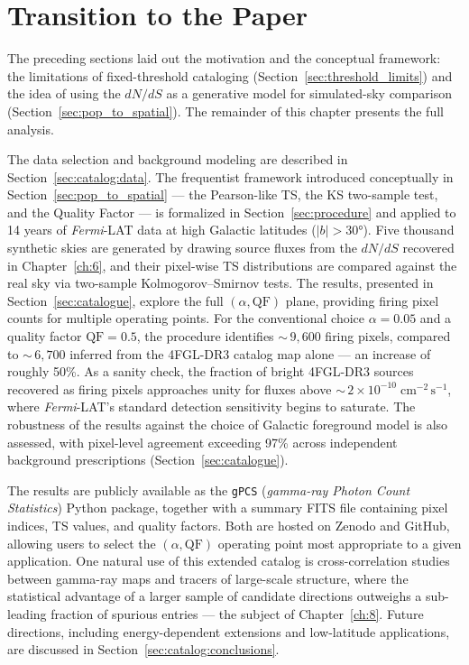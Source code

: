 
\section{Transition to the Paper}
\label{sec:transition_catalog}

The preceding sections laid out the motivation and the conceptual framework: the limitations of fixed-threshold cataloging (Section~\ref{sec:threshold_limits}) and the idea of using the $dN/dS$ as a generative model for simulated-sky comparison (Section~\ref{sec:pop_to_spatial}).
The remainder of this chapter presents the full analysis.

The data selection and background modeling are described in Section~\ref{sec:catalog:data}. The frequentist framework introduced conceptually in Section~\ref{sec:pop_to_spatial} --- the Pearson-like TS, the KS two-sample test, and the Quality Factor --- is formalized in Section~\ref{sec:procedure} and applied to 14 years of \textit{Fermi}-LAT data at high Galactic latitudes ($|b| > 30°$). Five thousand synthetic skies are generated by drawing source fluxes from the $dN/dS$ recovered in Chapter~\ref{ch:6}, and their pixel-wise TS distributions are compared against the real sky via two-sample Kolmogorov--Smirnov tests. The results, presented in Section~\ref{sec:catalogue}, explore the full $(\alpha, \mathrm{QF})$ plane, providing firing pixel counts for multiple operating points.
For the conventional choice $\alpha = 0.05$ and a quality factor $\mathrm{QF} = 0.5$, the procedure identifies ${\sim}\,9{,}600$ firing pixels, compared to ${\sim}\,6{,}700$ inferred from the 4FGL-DR3 catalog map alone --- an increase of roughly 50\%.
As a sanity check, the fraction of bright 4FGL-DR3 sources recovered as firing pixels approaches unity for fluxes above ${\sim}\,2 \times 10^{-10}\;\mathrm{cm^{-2}\,s^{-1}}$, where \textit{Fermi}-LAT's standard detection sensitivity begins to saturate.
The robustness of the results against the choice of Galactic foreground model is also assessed, with pixel-level agreement exceeding 97\% across independent background prescriptions (Section~\ref{sec:catalogue}).

The results are publicly available as the \texttt{gPCS} (\textit{gamma-ray Photon Count Statistics}) Python package, together with a summary FITS file containing pixel indices, TS values, and quality factors.
Both are hosted on Zenodo and GitHub, allowing users to select the $(\alpha, \mathrm{QF})$ operating point most appropriate to a given application.
One natural use of this extended catalog is cross-correlation studies between gamma-ray maps and tracers of large-scale structure, where the statistical advantage of a larger sample of candidate directions outweighs a sub-leading fraction of spurious entries --- the subject of Chapter~\ref{ch:8}. Future directions, including energy-dependent extensions and low-latitude applications, are discussed in Section~\ref{sec:catalog:conclusions}.
